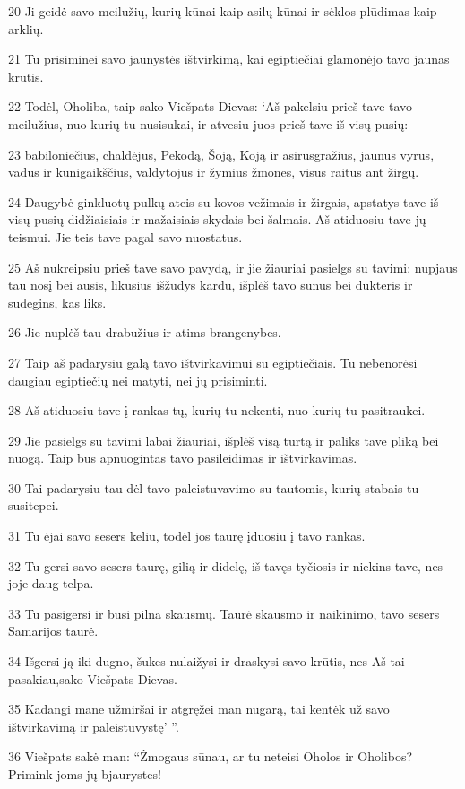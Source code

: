 \par 20 Ji geidė savo meilužių, kurių kūnai kaip asilų kūnai ir sėklos plūdimas kaip arklių. 
\par 21 Tu prisiminei savo jaunystės ištvirkimą, kai egiptiečiai glamonėjo tavo jaunas krūtis. 
\par 22 Todėl, Oholiba, taip sako Viešpats Dievas: ‘Aš pakelsiu prieš tave tavo meilužius, nuo kurių tu nusisukai, ir atvesiu juos prieš tave iš visų pusių: 
\par 23 babiloniečius, chaldėjus, Pekodą, Šoją, Koją ir asirus­gražius, jaunus vyrus, vadus ir kunigaikščius, valdytojus ir žymius žmones, visus raitus ant žirgų. 
\par 24 Daugybė ginkluotų pulkų ateis su kovos vežimais ir žirgais, apstatys tave iš visų pusių didžiaisiais ir mažaisiais skydais bei šalmais. Aš atiduosiu tave jų teismui. Jie teis tave pagal savo nuostatus. 
\par 25 Aš nukreipsiu prieš tave savo pavydą, ir jie žiauriai pasielgs su tavimi: nupjaus tau nosį bei ausis, likusius išžudys kardu, išplėš tavo sūnus bei dukteris ir sudegins, kas liks. 
\par 26 Jie nuplėš tau drabužius ir atims brangenybes. 
\par 27 Taip aš padarysiu galą tavo ištvirkavimui su egiptiečiais. Tu nebenorėsi daugiau egiptiečių nei matyti, nei jų prisiminti. 
\par 28 Aš atiduosiu tave į rankas tų, kurių tu nekenti, nuo kurių tu pasitraukei. 
\par 29 Jie pasielgs su tavimi labai žiauriai, išplėš visą turtą ir paliks tave pliką bei nuogą. Taip bus apnuogintas tavo pasileidimas ir ištvirkavimas. 
\par 30 Tai padarysiu tau dėl tavo paleistuvavimo su tautomis, kurių stabais tu susitepei. 
\par 31 Tu ėjai savo sesers keliu, todėl jos taurę įduosiu į tavo rankas. 
\par 32 Tu gersi savo sesers taurę, gilią ir didelę, iš tavęs tyčiosis ir niekins tave, nes joje daug telpa. 
\par 33 Tu pasigersi ir būsi pilna skausmų. Taurė skausmo ir naikinimo, tavo sesers Samarijos taurė. 
\par 34 Išgersi ją iki dugno, šukes nulaižysi ir draskysi savo krūtis, nes Aš tai pasakiau,­sako Viešpats Dievas.­ 
\par 35 Kadangi mane užmiršai ir atgręžei man nugarą, tai kentėk už savo ištvirkavimą ir paleistuvystę’ ”. 
\par 36 Viešpats sakė man: “Žmogaus sūnau, ar tu neteisi Oholos ir Oholibos? Primink joms jų bjaurystes! 
